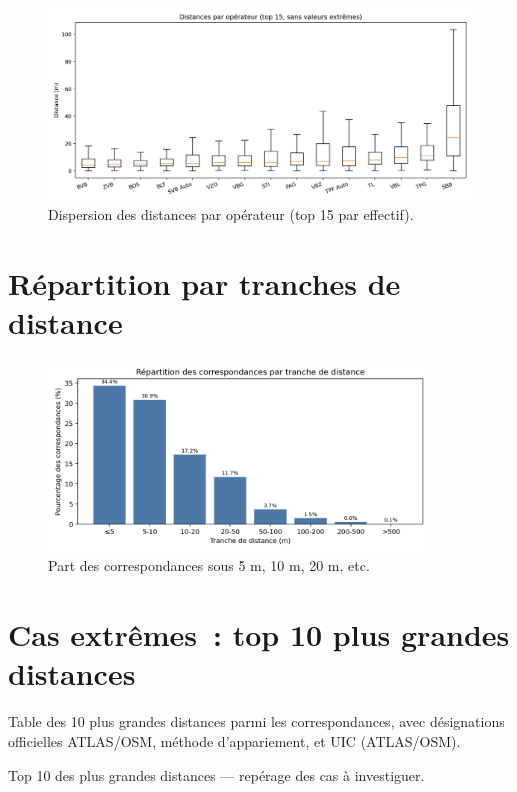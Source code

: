 \begin{figure}[H]
    \centering
    \includegraphics[width=\textwidth]{../figures/chap5/distances_by_operator_box.png}
    \caption[Distances par opérateur]{Dispersion des distances par opérateur (top 15 par effectif).}
\end{figure}

\section{Répartition par tranches de distance}

\begin{figure}[H]
    \centering
    \includegraphics[width=0.9\textwidth]{../figures/chap5/distance_coverage_buckets.png}
    \caption[Tranches de distance]{Part des correspondances sous 5 m, 10 m, 20 m, etc.}
\end{figure}

\section{Cas extrêmes : top 10 plus grandes distances}

Table des 10 plus grandes distances parmi les correspondances, avec désignations officielles ATLAS/OSM, méthode d'appariement, et UIC (ATLAS/OSM).

\begin{table}[H]
    \centering
    
    \caption[Top 10 distances]{Top 10 des plus grandes distances — repérage des cas à investiguer.}
\end{table}
